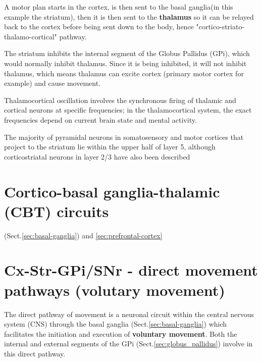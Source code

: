 A motor plan starts in the cortex, is then sent to the basal ganglia(in this
example the striatum), then it is then sent to the {\bf thalamus} so it can be
relayed back to the cortex before being sent down to the body, hence
"cortico-striato-thalamo-cortical" pathway.


The striatum inhibits the internal segment of the Globus Pallidus (GPi), which
would normally inhibit thalamus.  Since it is being inhibited, it will not
inhibit thalamus, which means thalamus can excite cortex (primary motor cortex
for example) and cause movement.

Thalamocortical oscillation involves the synchronous firing of thalamic and
cortical neurons at specific frequencies; in the thalamocortical system, the
exact frequencies depend on current brain state and mental activity.


The majority of pyramidal neurons in somatosensory and motor cortices that
project to the striatum lie within the upper half of layer 5, although
corticostriatal neurons in layer 2/3 have also been described






\section{Cortico-basal ganglia-thalamic (CBT) circuits}
\label{sec:cortico-basal-ganglia-thalamic}

(Sect.\ref{sec:basal-ganglia})
and \ref{sec:prefrontal-cortex}

\section{Cx-Str-GPi/SNr - direct movement pathways (volutary movement)}
\label{sec:direct_movement_pathway}

The direct pathway of movement is a neuronal circuit within the central nervous
system (CNS) through the basal ganglia (Sect.\ref{sec:basal-ganglia}) which
facilitates the initiation and execution of {\bf voluntary movement}.
Both the internal and external segments of the GPi
(Sect.\ref{sec:globus_pallidus}) involve in this direct pathway.

